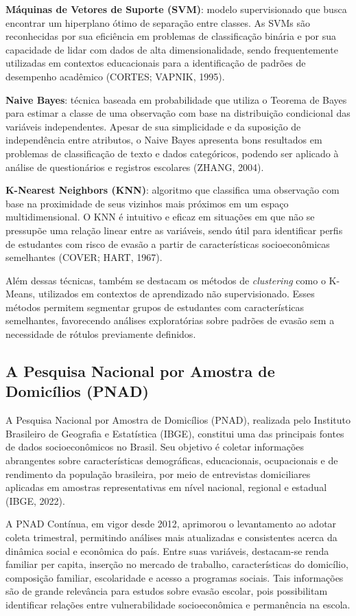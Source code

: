 \documentclass[english, spanish, brazilian]{RBIEarticle} %
\begin{document}
\textbf{Máquinas de Vetores de Suporte (SVM)}: modelo supervisionado que busca encontrar um hiperplano ótimo de separação entre classes. As SVMs são reconhecidas por sua eficiência em problemas de classificação binária e por sua capacidade de lidar com dados de alta dimensionalidade, sendo frequentemente utilizadas em contextos educacionais para a identificação de padrões de desempenho acadêmico (CORTES; VAPNIK, 1995).

\textbf{Naive Bayes}: técnica baseada em probabilidade que utiliza o Teorema de Bayes para estimar a classe de uma observação com base na distribuição condicional das variáveis independentes. Apesar de sua simplicidade e da suposição de independência entre atributos, o Naive Bayes apresenta bons resultados em problemas de classificação de texto e dados categóricos, podendo ser aplicado à análise de questionários e registros escolares (ZHANG, 2004).

\textbf{K-Nearest Neighbors (KNN)}: algoritmo que classifica uma observação com base na proximidade de seus vizinhos mais próximos em um espaço multidimensional. O KNN é intuitivo e eficaz em situações em que não se pressupõe uma relação linear entre as variáveis, sendo útil para identificar perfis de estudantes com risco de evasão a partir de características socioeconômicas semelhantes (COVER; HART, 1967).

Além dessas técnicas, também se destacam os métodos de \textit{clustering} como o K-Means, utilizados em contextos de aprendizado não supervisionado. Esses métodos permitem segmentar grupos de estudantes com características semelhantes, favorecendo análises exploratórias sobre padrões de evasão sem a necessidade de rótulos previamente definidos.

\subsection{A Pesquisa Nacional por Amostra de Domicílios (PNAD)}
A Pesquisa Nacional por Amostra de Domicílios (PNAD), realizada pelo Instituto Brasileiro de Geografia e Estatística (IBGE), constitui uma das principais fontes de dados socioeconômicos no Brasil. Seu objetivo é coletar informações abrangentes sobre características demográficas, educacionais, ocupacionais e de rendimento da população brasileira, por meio de entrevistas domiciliares aplicadas em amostras representativas em nível nacional, regional e estadual (IBGE, 2022).

A PNAD Contínua, em vigor desde 2012, aprimorou o levantamento ao adotar coleta trimestral, permitindo análises mais atualizadas e consistentes acerca da dinâmica social e econômica do país. Entre suas variáveis, destacam-se renda familiar per capita, inserção no mercado de trabalho, características do domicílio, composição familiar, escolaridade e acesso a programas sociais. Tais informações são de grande relevância para estudos sobre evasão escolar, pois possibilitam identificar relações entre vulnerabilidade socioeconômica e permanência na escola.
\end{document}
